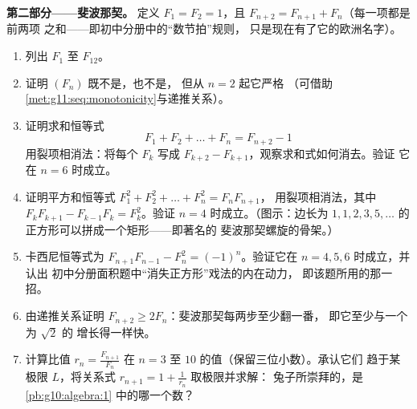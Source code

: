 \begin{problem}
\medskip
\noindent\textbf{第二部分——斐波那契。}
定义 $F_1 = F_2 = 1$，且 $F_{n+2} = F_{n+1} + F_n$（每一项都是前两项
之和——即初中分册中的“数节拍”规则，
只是现在有了它的欧洲名字）。
\begin{enumerate}[resume]
  \item 列出 $F_1$ 至 $F_{12}$。
  \item 证明 $(F_n)$ 既不是，也不是，
        但从 $n = 2$ 起它严格
        （可借助\cref{met:g11:seq:monotonicity}与递推关系）。
  \item 证明求和恒等式
        \[
        F_1 + F_2 + \dots + F_n = F_{n+2} - 1
        \]
        用裂项相消法：将每个 $F_k$ 写成
        $F_{k+2} - F_{k+1}$，观察求和式如何消去。验证
        它在 $n = 6$ 时成立。
  \item 证明平方和恒等式
        $F_1^2 + F_2^2 + \dots + F_n^2 = F_n F_{n+1}$，
        用裂项相消法，其中
        $F_k F_{k+1} - F_{k-1} F_k = F_k^2$。验证
        $n = 4$ 时成立。（图示：边长为
        $1, 1, 2, 3, 5, \dots$ 的正方形可以拼成一个矩形——即著名的
        斐波那契螺旋的骨架。）
  \item 卡西尼恒等式为
        $F_{n+1} F_{n-1} - F_n^2 = (-1)^n$。验证它在
        $n = 4, 5, 6$ 时成立，并认出
        初中分册面积题中“消失正方形”戏法的内在动力，
        即该题所用的那一招。
  \item 由递推关系证明
        $F_{n+2} \geq 2 F_n$：斐波那契每两步至少翻一番，
        即它至少与一个为 $\sqrt2$ 的
        增长得一样快。
  \item 计算比值 $r_n = \frac{F_{n+1}}{F_n}$ 在
        $n = 3$ 至 $10$ 的值（保留三位小数）。承认它们
        趋于某极限 $L$，将关系式
        $r_{n+1} = 1 + \frac{1}{r_n}$ 取极限并求解：
        兔子所崇拜的，是\cref{pb:g10:algebra:1}
        中的哪一个数？
\end{enumerate}


\end{problem}
